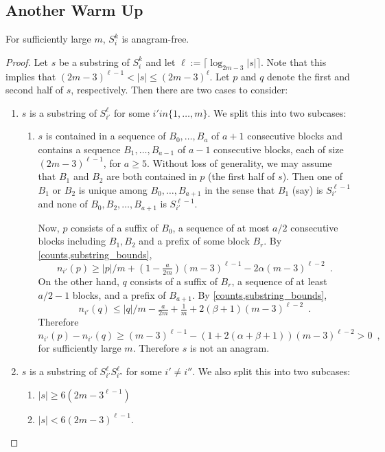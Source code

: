 \documentclass[kpfonts]{patmorin}
\begin{document}
\subsection{Another Warm Up}

\begin{clm}
    For sufficiently large $m$, $S_i^k$ is anagram-free.
\end{clm}

\begin{proof}
    Let $s$ be a substring of $S_i^k$ and let $\ell:=\lceil \log_{2m-3} |s|\rceil$.  Note that this implies that $(2m-3)^{\ell-1} < |s| \le (2m-3)^\ell$.   Let $p$ and $q$ denote the first and second half of $s$, respectively.  Then there are two cases to consider:
    \begin{enumerate}
        \item $s$ is a substring of $S_{i'}^\ell$ for some $i'in\{1,\ldots,m\}$.  We split this into two subcases:
        \begin{enumerate}
            \item $s$ is contained in a sequence of $B_0,\ldots,B_a$ of $a+1$ consecutive blocks and contains a sequence $B_1,\ldots,B_{a-1}$ of $a-1$ consecutive blocks, each of size $(2m-3)^{\ell-1}$, for $a\ge 5$. Without loss of generality, we may assume that $B_1$ and $B_2$ are both contained in $p$ (the first half of $s$).  Then one of $B_1$ or $B_2$ is unique among $B_0,\ldots,B_{a+1}$ in the sense that $B_1$ (say) is $S_{i'}^{\ell-1}$ and none of $B_0,B_2,\ldots,B_{a+1}$ is $S_{i'}^{\ell-1}$.

            Now, $p$ consists of a suffix of $B_0$, a sequence of at most $a/2$ consecutive blocks including $B_1,B_2$ and a prefix of some block $B_r$.  By \cref{counts,substring_bounds},
            \[
                    n_{i'}(p) \ge |p|/m + (1-\tfrac{a}{2m})(m-3)^{\ell-1} - 2\alpha(m-3)^{\ell-2} \enspace .
            \]
            On the other hand, $q$ consists of a suffix of $B_r$, a sequence of at least $a/2-1$ blocks, and a prefix of $B_{a+1}$.  By \cref{counts,substring_bounds},
            \[
                n_{i'}(q) \le |q|/m - \tfrac{a}{2m} +\tfrac{1}{m} + 2(\beta+1)(m-3)^{\ell-2} \enspace .
            \]
            Therefore
            \[
                n_{i'}(p)-n_{i'}(q) \ge (m-3)^{\ell-1} -(1+2(\alpha+\beta+1))(m-3)^{\ell-2} > 0 \enspace ,
            \]
            for sufficiently large $m$.  Therefore $s$ is not an anagram.
        \end{enumerate}

        \item $s$ is a substring of $S_{i'}^\ell S_{i''}^\ell$ for some $i'\neq i''$.  We also split this into two subcases:
        \begin{enumerate}
            \item $|s|\ge 6(2m-3^{\ell-1})$
            \item $|s|< 6(2m-3)^{\ell-1}$.
        \end{enumerate}
    \end{enumerate}
\end{proof}
\end{document}
